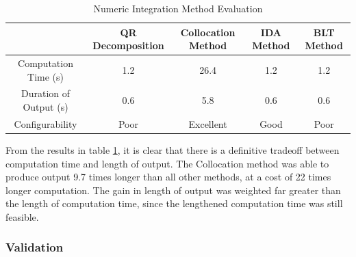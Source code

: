 \documentclass[12pt,letterpaper]{article}
\begin{document}
\begin{table}[ht]
\caption{Numeric Integration Method Evaluation}
\centering
\begin{tabular}{|c| c| c| c| c|}
\hline\hline
& QR Decomposition & Collocation Method & IDA Method & BLT Method \\ 
\hline
Computation Time (s) & 1.2 & 26.4 & 1.2 & 1.2\\
\hline
Duration of Output (s) & 0.6 & 5.8 & 0.6 & 0.6\\
\hline
Configurability & Poor & Excellent & Good & Poor\\ [1ex]
\hline
\end{tabular}
\label{table:evaluation}
\end{table}
From the results in table \ref{table:evaluation}, it is clear that there is a definitive tradeoff between computation time and length of output.
The Collocation method was able to produce output 9.7 times longer than all other methods, at a cost of 22 times longer computation.  
The gain in length of output was weighted far greater than the length of computation time, since the lengthened computation time was still feasible.

\subsubsection{Validation}


\newpage
{}

\end{document}
